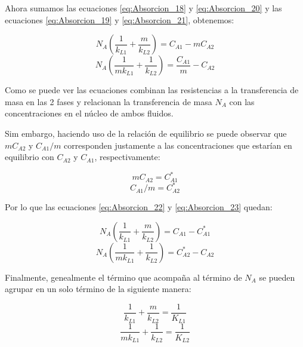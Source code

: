 \documentclass[11pt]{book}
\begin{document}
Ahora sumamos las ecuaciones \ref{eq:Absorcion_18} y \ref{eq:Absorcion_20} y las ecuaciones \ref{eq:Absorcion_19} y \ref{eq:Absorcion_21}, obtenemos:

\begin{equation}
    \label{eq:Absorcion_22}
    N_A \left( \frac{1}{k_{L1}} + \frac{m}{k_{L2}}\right) = C_{A1} - m C_{A2}
\end{equation}
\begin{equation}
    \label{eq:Absorcion_23}
     N_A \left( \frac{1}{m k_{L1}} + \frac{1}{k_{L2}}\right) = \frac{C_{A1}}{m} - C_{A2}
\end{equation}

Como se puede ver las ecuaciones combinan las resistencias a la transferencia de masa en las 2 fases y relacionan la transferencia de masa $N_A$ con las concentraciones en el núcleo de ambos fluidos.

Sim embargo, haciendo uso de la relación de equilibrio se puede observar que $mC_{A2}$ y 
$C_{A1}/m$ corresponden justamente a las concentraciones que estarían en equilibrio con $C_{A2}$ y $C_{A1}$, respectivamente:

\begin{equation*}
    m C_{A2} = C_{A1}^*
\end{equation*}
\begin{equation*}
    C_{A1}/m = C_{A2}^*
\end{equation*}

Por lo que las ecuaciones \ref{eq:Absorcion_22} y \ref{eq:Absorcion_23} quedan:

\begin{equation}
    \label{eq:Absorcion_24}
    N_A \left( \frac{1}{k_{L1}} + \frac{m}{k_{L2}}\right) = C_{A1} - C_{A1}^*
\end{equation}
\begin{equation}
    \label{eq:Absorcion_25}
     N_A \left( \frac{1}{m k_{L1}} + \frac{1}{k_{L2}}\right) = C_{A2}^* - C_{A2}
\end{equation}

Finalmente, genealmente el término que acompaña al término de $N_A$ se pueden agrupar en un solo término de la siguiente manera:

\begin{equation*}
   \frac{1}{k_{L1}} + \frac{m}{k_{L2}} = \frac{1}{K_{L1}}
\end{equation*}
\begin{equation*}
    \frac{1}{m k_{L1}} + \frac{1}{k_{L2}} = \frac{1}{K_{L2}}
\end{equation*}
\end{document}
